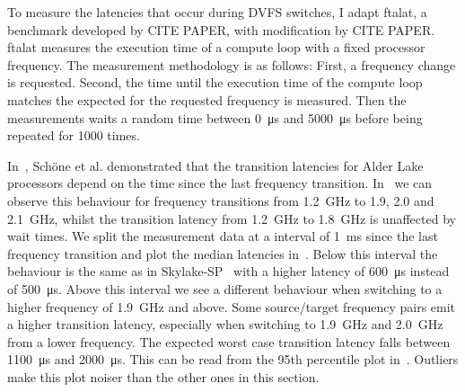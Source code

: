 
To measure the latencies that occur during DVFS switches, I adapt ftalat, a benchmark developed by CITE PAPER, with modification by CITE PAPER.
ftalat measures the execution time of a compute loop with a fixed processor frequency.
The measurement methodology is as follows:
First, a frequency change is requested.
Second, the time until the execution time of the compute loop matches the expected for the requested frequency is measured.
Then the measurements waits a random time between \SI{0}{\us} and \SI{5000}{\us} before being repeated for \SI{1000}{} times.

In~\cite{Schoene_2024_Alder_Lake}, Schöne et al. demonstrated that the transition latencies for Alder Lake processors depend on the time since the last frequency transition.
In~ we can observe this behaviour for frequency transitions from \SI{1.2}{\GHz} to \SI{1.9}{}, \SI{2.0}{} and \SI{2.1}{\GHz}, whilst the transition latency from \SI{1.2}{\GHz} to \SI{1.8}{\GHz} is unaffected by wait times.
We split the measurement data at a interval of \SI{1}{\ms} since the last frequency transition and plot the median latencies in~.
Below this interval the behaviour is the same as in Skylake-SP~\cite{Schoene_2019_SKL} with a higher latency of \SI{600}{\us} instead of \SI{500}{\us}.
Above this interval we see a different behaviour when switching to a higher frequency of \SI{1.9}{\GHz} and above.
Some source/target frequency pairs emit a higher transition latency, especially when switching to \SI{1.9}{\GHz} and \SI{2.0}{\GHz} from a lower frequency.
The expected worst case transition latency falls between \SI{1100}{\us} and \SI{2000}{\us}.
This can be read from the 95th percentile plot in~.
Outliers make this plot noiser than the other ones in this section.

